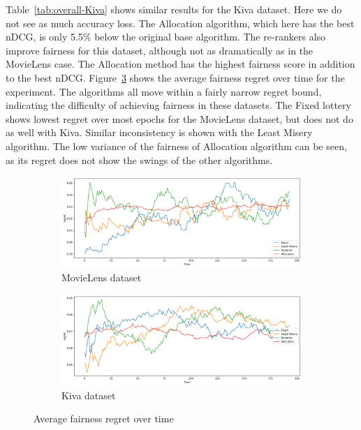 Table~\ref{tab:overall-Kiva} shows similar results for the Kiva dataset. Here we do not see as much accuracy loss. The Allocation algorithm, which here has the best nDCG, is only 5.5\% below the original base algorithm. The re-rankers also improve fairness for this dataset, although not as dramatically as in the MovieLens case. The Allocation method has the highest fairness score in addition to the best nDCG. Figure~\ref{fig:local-regret} shows the average fairness regret over time for the experiment. The algorithms all move within a fairly narrow regret bound, indicating the difficulty of achieving fairness in these datasets. The Fixed lottery shows lowest regret over most epochs for the MovieLens dataset, but does not do as well with Kiva. Similar inconsistency is shown with the Least Misery algorithm. The low variance of the fairness of Allocation algorithm can be seen, as its regret does not show the swings of the other algorithms.


\begin{figure}[tbh]
\setlength\tabcolsep{0pt}
    \begin{subfigure}{1.0\textwidth}
    \centering
    \includegraphics[width=4.5in]{imgs/dynfair/ml_avg_regret_overtime_sep20.png}
    \caption{MovieLens dataset}
    \label{fig:local-regret-ML}
    \end{subfigure}
    \begin{subfigure}{1.0\textwidth}
    \centering
      \includegraphics[width=4.5in]{imgs/dynfair/kiva_avg_regret_overtime_sep20.png}
    \caption{Kiva dataset}
    \label{fig:local-regret-Kiva}
    \end{subfigure}
    \caption{Average fairness regret over time}
    \label{fig:local-regret}
\end{figure}

